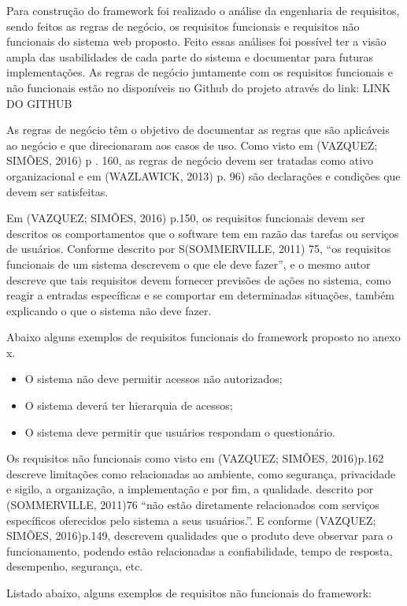 \documentclass[
	12pt,				%
	openright,			%
	oneside,			%
	a4paper,			%
	english,			%
	french,				%
	spanish,			%
	brazil,				%
	]{abntex2}
\begin{document}
Para construção do framework foi realizado o análise da engenharia de requisitos, sendo feitos as regras de negócio, os requisitos funcionais e requisitos não funcionais do sistema web proposto. Feito essas análises foi possível ter a visão ampla das usabilidades de cada parte do sistema e documentar para futuras implementações.  As regras de negócio juntamente com os requisitos funcionais e não funcionais estão no disponíveis no Github do projeto através do link: LINK DO GITHUB

As regras de negócio têm o objetivo de documentar as regras que são aplicáveis ao negócio e que direcionaram aos casos de uso. Como visto em (VAZQUEZ; SIMÕES, 2016) p . 160, as regras de negócio devem ser tratadas como ativo organizacional e em (WAZLAWICK, 2013) p. 96) são declarações e condições que devem ser satisfeitas.

Em (VAZQUEZ; SIMÕES, 2016) p.150, os requisitos funcionais devem ser descritos os comportamentos que o software tem em razão das tarefas ou serviços de usuários. Conforme descrito por S(SOMMERVILLE, 2011) 75, “os requisitos funcionais de um sistema descrevem o que ele deve fazer”, e o mesmo autor descreve que tais requisitos devem fornecer previsões de ações no sistema, como reagir a entradas específicas e se comportar em determinadas situações, também explicando o que o sistema não deve fazer.

Abaixo alguns exemplos de requisitos funcionais do framework proposto no anexo x.
\begin{itemize}
\item O sistema não deve permitir acessos não autorizados;
\item O sistema deverá ter hierarquia de acessos;
\item O sistema deve permitir que usuários respondam o questionário.
\end{itemize}

Os requisitos não funcionais como visto em (VAZQUEZ; SIMÕES, 2016)p.162 descreve limitações como relacionadas ao ambiente, como segurança, privacidade e sigilo, a organização, a implementação e por fim, a qualidade. descrito por (SOMMERVILLE, 2011)76 “não estão diretamente relacionados com serviços específicos oferecidos pelo sistema a seus usuários.”. E conforme (VAZQUEZ; SIMÕES, 2016)p.149, descrevem qualidades que o produto deve observar para o funcionamento, podendo estão relacionadas a confiabilidade, tempo de resposta, desempenho, segurança, etc.

Listado abaixo, alguns exemplos de requisitos não funcionais do framework:
\end{document}
